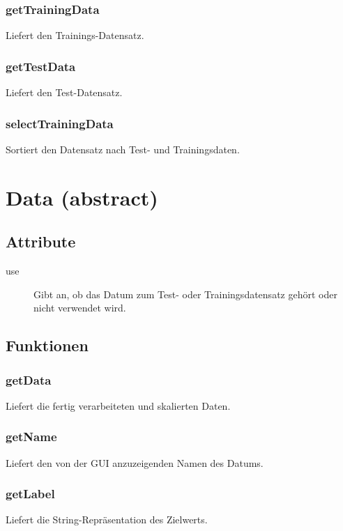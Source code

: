 \documentclass[a4paper,10pt]{scrartcl}
\begin{document}
\subsubsection{getTrainingData}
Liefert den Trainings-Datensatz.

\subsubsection{getTestData}
Liefert den Test-Datensatz.

\subsubsection{selectTrainingData}
Sortiert den Datensatz nach Test- und Trainingsdaten.

\section{Data (abstract)}

\subsection{Attribute}

\begin{description}
\item[use] Gibt an, ob das Datum zum Test- oder Trainingsdatensatz gehört oder nicht verwendet wird.
\end{description}

\subsection{Funktionen}

\subsubsection{getData}
Liefert die fertig verarbeiteten und skalierten Daten.

\subsubsection{getName}
Liefert den von der GUI anzuzeigenden Namen des Datums.

\subsubsection{getLabel}
Liefert die String-Repräsentation des Zielwerts.
\end{document}
